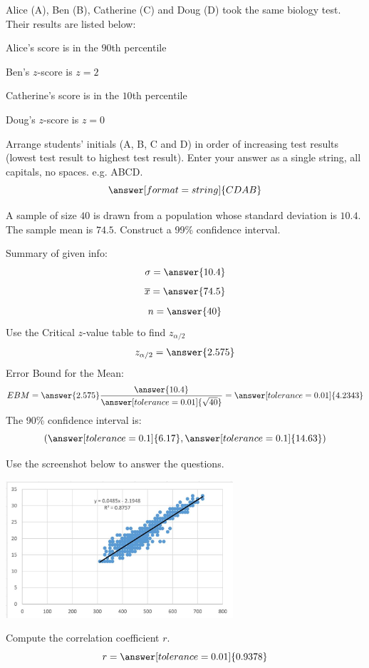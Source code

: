 \documentclass{ximera}
\begin{document}
\begin{problem}\label{prob:140finalprob3}
Alice (A), Ben (B), Catherine (C) and Doug (D) took the same biology test.  Their results are listed below: 

Alice's score is in the $90$th percentile 

Ben's $z$-score is $z = 2$ 

Catherine's score is in the $10$th percentile 

Doug's $z$-score is $z = 0$

Arrange students’ initials (A, B, C and D) in order of increasing test results (lowest test result to highest test result).  Enter your answer as a single string, all capitals, no spaces.  e.g. ABCD.
$$\answer[format=string]{CDAB}$$
\end{problem}

\begin{problem}\label{prob:140finalprob4}
A sample of size $40$ is drawn from a population whose standard deviation is $10.4$.  The sample mean is $74.5$.  Construct a 99\% confidence interval.

Summary of given info:
$$\sigma=\answer{10.4}$$
$$\overline{x}=\answer{74.5}$$
$$n=\answer{40}$$
Use the Critical $z$-value table to find $z_{\alpha/2}$
$$z_{\alpha/2}=\answer{2.575}$$
Error Bound for the Mean:
$$EBM=\answer{2.575}\frac{\answer{10.4}}{\answer[tolerance=0.01]{\sqrt{40}}}=\answer[tolerance=0.01]{4.2343}$$
The 90\% confidence interval is:
$$(\answer[tolerance=0.1]{6.17},\answer[tolerance=0.1]{14.63})$$
\end{problem}

\begin{problem}\label{prob:140finalprob5}
Use the screenshot below to answer the questions.  

\begin{center}
\includegraphics[height=2in]{140finalpic1.jpg}
\end{center}

Compute the correlation coefficient $r$.
 $$r=\answer[tolerance=0.01]{0.9378}$$
\end{problem}
\end{document}
